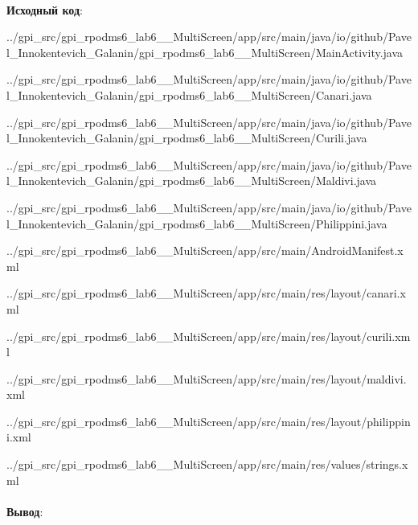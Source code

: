 \documentclass[12pt, a4paper, simple]{eskdtext}
\begin{document}
    \paragraph{} \textbf{Исходный код}: 

    
        {../gpi_src/gpi_rpodms6_lab6__MultiScreen/app/src/main/java/io/github/Pavel_Innokentevich_Galanin/gpi_rpodms6_lab6__MultiScreen/MainActivity.java}
    
    
        {../gpi_src/gpi_rpodms6_lab6__MultiScreen/app/src/main/java/io/github/Pavel_Innokentevich_Galanin/gpi_rpodms6_lab6__MultiScreen/Canari.java}
    
        {../gpi_src/gpi_rpodms6_lab6__MultiScreen/app/src/main/java/io/github/Pavel_Innokentevich_Galanin/gpi_rpodms6_lab6__MultiScreen/Curili.java}
    
        {../gpi_src/gpi_rpodms6_lab6__MultiScreen/app/src/main/java/io/github/Pavel_Innokentevich_Galanin/gpi_rpodms6_lab6__MultiScreen/Maldivi.java}
    
        {../gpi_src/gpi_rpodms6_lab6__MultiScreen/app/src/main/java/io/github/Pavel_Innokentevich_Galanin/gpi_rpodms6_lab6__MultiScreen/Philippini.java}

    
        {../gpi_src/gpi_rpodms6_lab6__MultiScreen/app/src/main/AndroidManifest.xml}

    
        {../gpi_src/gpi_rpodms6_lab6__MultiScreen/app/src/main/res/layout/canari.xml}
    
        {../gpi_src/gpi_rpodms6_lab6__MultiScreen/app/src/main/res/layout/curili.xml}
    
        {../gpi_src/gpi_rpodms6_lab6__MultiScreen/app/src/main/res/layout/maldivi.xml}
    
        {../gpi_src/gpi_rpodms6_lab6__MultiScreen/app/src/main/res/layout/philippini.xml}

    
        {../gpi_src/gpi_rpodms6_lab6__MultiScreen/app/src/main/res/values/strings.xml}

    \paragraph{} \textbf{Вывод}:
    
\end{document}
